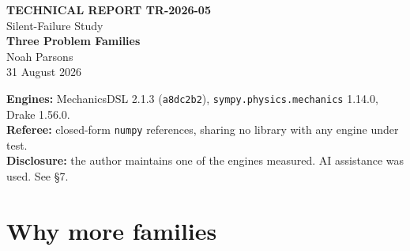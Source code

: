 \documentclass[11pt,a4paper]{article}
\newcommand{\gitsha}[1]{\texttt{#1}}
\begin{document}
\begin{titlepage}
\centering
\vspace*{2.2cm}
{\footnotesize\bfseries TECHNICAL REPORT TR-2026-05}\\[0.4em]
{\footnotesize Silent-Failure Study}\\[2.0cm]
{\LARGE\bfseries Three Problem Families}\\[1.5cm]
{\large Noah Parsons}\\[0.5cm]
{\normalsize 31 August 2026}\\[2.0cm]
\begin{minipage}{0.82\textwidth}
\small
\textbf{Engines:} MechanicsDSL 2.1.3 (\gitsha{a8dc2b2}),
\texttt{sympy.physics.mechanics} 1.14.0, Drake 1.56.0.\\[0.4em]
\textbf{Referee:} closed-form \texttt{numpy} references, sharing no library
with any engine under test.\\[0.4em]
\textbf{Disclosure:} the author maintains one of the engines measured. AI
assistance was used. See \S7.
\end{minipage}
\vfill
\end{titlepage}

\begin{abstract}
\noindent
The study's principal weakness was that every result came from one planar
pendulum chain. Two structurally different families were therefore added: a
slider--crank, which introduces a prismatic joint, a closed loop, and dead
centres where the effective inertia collapses for geometric reasons; and a
cart--pole, a tree with mixed joint types and a configuration-dependent mass
matrix whose determinant collapses when the cart is light. Across 72
engine--case pairs spanning both new families there were no disagreements and
no refusals: all three engines matched the independent references to
$1.3\times10^{-14}$ or better, on derivation and on integration, including at
the degenerate configurations. \S5 records why one engine participates on
different terms on the slider--crank, which is a consequence of its supported
interfaces rather than of its dynamics, and why the cart--pole was chosen partly
to avoid that asymmetry. \S6 documents a diagnostic that caught three of this
study's own errors and is the most transferable result here.
\end{abstract}

\tableofcontents
\bigskip

\section{Why more families}
\end{document}
